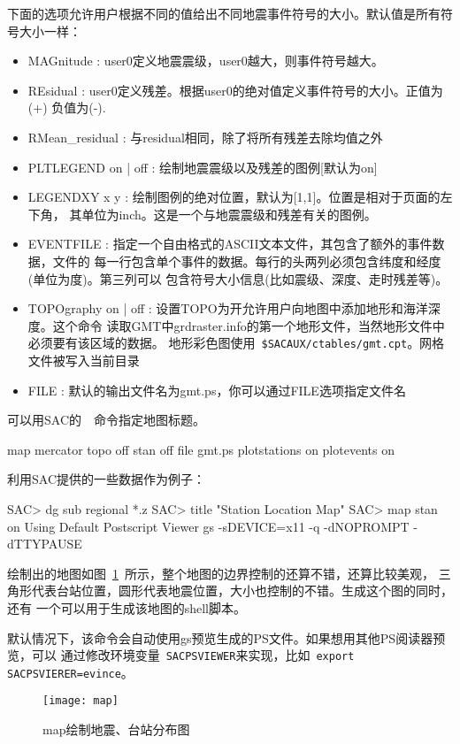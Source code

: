 下面的选项允许用户根据不同的值给出不同地震事件符号的大小。默认值是所有符号大小一样：
\begin{itemize}
\item MAGnitude : user0定义地震震级，user0越大，则事件符号越大。
\item REsidual : user0定义残差。根据user0的绝对值定义事件符号的大小。正值为(+) 负值为(-).
\item RMean\_residual : 与residual相同，除了将所有残差去除均值之外
\item PLTLEGEND on | off : 绘制地震震级以及残差的图例[默认为on]
\item LEGENDXY x y : 绘制图例的绝对位置，默认为[1,1]。位置是相对于页面的左下角，
    其单位为inch。这是一个与地震震级和残差有关的图例。
\item EVENTFILE : 指定一个自由格式的ASCII文本文件，其包含了额外的事件数据，文件的
    每一行包含单个事件的数据。每行的头两列必须包含纬度和经度(单位为度)。第三列可以
    包含符号大小信息(比如震级、深度、走时残差等)。
\item TOPOgraphy on | off : 设置TOPO为开允许用户向地图中添加地形和海洋深度。这个命令
    读取GMT中grdraster.info的第一个地形文件，当然地形文件中必须要有该区域的数据。
    地形彩色图使用~\verb+$SACAUX/ctables/gmt.cpt+。网格文件被写入当前目录
\item FILE : 默认的输出文件名为gmt.ps，你可以通过FILE选项指定文件名
\end{itemize}
可以用SAC的~~命令指定地图标题。

\begin{SACDFT}
map mercator topo off stan off file gmt.ps plotstations on
    plotevents on
\end{SACDFT}

利用SAC提供的一些数据作为例子：
\begin{SACCode}
SAC> dg sub regional *.z
SAC> title "Station Location Map"
SAC> map stan on
Using Default Postscript Viewer
	gs -sDEVICE=x11 -q -dNOPROMPT -dTTYPAUSE
\end{SACCode}
绘制出的地图如图~\ref{fig:map}~所示，整个地图的边界控制的还算不错，还算比较美观，
三角形代表台站位置，圆形代表地震位置，大小也控制的不错。生成这个图的同时，还有
一个可以用于生成该地图的shell脚本。

默认情况下，该命令会自动使用gs预览生成的PS文件。如果想用其他PS阅读器预览，可以
通过修改环境变量~\verb+SACPSVIEWER+来实现，比如~\verb+export SACPSVIERER=evince+。

\begin{figure}[!ht]
\centering
\texttt{[image: map]}
\caption{map绘制地震、台站分布图}
\label{fig:map}
\end{figure}

